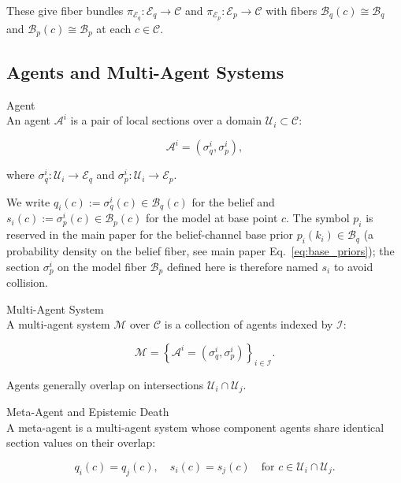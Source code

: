 \documentclass[twoside,11pt]{article}
\begin{document}
These give fiber bundles $\pi_{\mathcal{E}_q}: \mathcal{E}_q \to \mathcal{C}$ and $\pi_{\mathcal{E}_p}: \mathcal{E}_p \to \mathcal{C}$ with fibers $\mathcal{B}_q(c) \cong \mathcal{B}_q$ and $\mathcal{B}_p(c) \cong \mathcal{B}_p$ at each $c \in \mathcal{C}$.

\subsection{Agents and Multi-Agent Systems}
Agent\\
An agent $\mathcal{A}^i$ is a pair of local sections over a domain $\mathcal{U}_i \subset \mathcal{C}$:

\begin{equation}
\mathcal{A}^i = \left(\sigma^i_q, \sigma^i_p\right),
\end{equation}

where $\sigma^i_q : \mathcal{U}_i \to \mathcal{E}_q$ and $\sigma^i_p : \mathcal{U}_i \to \mathcal{E}_p$.

We write $q_i(c) := \sigma^i_q(c) \in \mathcal{B}_q(c)$ for the belief and $s_i(c) := \sigma^i_p(c) \in \mathcal{B}_p(c)$ for the model at base point $c$. The symbol $p_i$ is reserved in the main paper for the belief-channel base prior $p_i(k_i) \in \mathcal{B}_q$ (a probability density on the belief fiber, see main paper Eq.~\ref{eq:base_priors}); the section $\sigma^i_p$ on the model fiber $\mathcal{B}_p$ defined here is therefore named $s_i$ to avoid collision.

Multi-Agent System\\
A multi-agent system $\mathcal{M}$ over $\mathcal{C}$ is a collection of agents indexed by $\mathcal{I}$:

\begin{equation}
\mathcal{M} = \left\{\mathcal{A}^i = \left(\sigma^i_q, \sigma^i_p\right)\right\}_{i \in \mathcal{I}}.
\end{equation}

Agents generally overlap on intersections $\mathcal{U}_i \cap \mathcal{U}_j$.

Meta-Agent and Epistemic Death\\
A meta-agent is a multi-agent system whose component agents share identical section values on their overlap:

\begin{equation}
q_i(c) = q_j(c), \quad s_i(c) = s_j(c) \quad \text{for } c \in \mathcal{U}_i \cap \mathcal{U}_j.
\end{equation}
\end{document}
